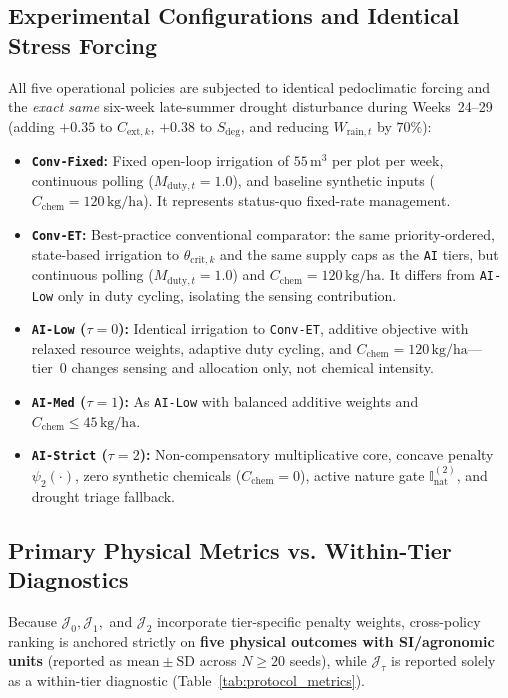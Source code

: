 \documentclass[11pt,a4paper]{article}
\newcommand{\Inat}{\mathbb{I}_{\mathrm{nat}}}
\begin{document}
\subsection{Experimental Configurations and Identical Stress Forcing}
All five operational policies are subjected to identical pedoclimatic forcing and the \emph{exact same} six-week late-summer drought disturbance during Weeks~24--29 (adding $+0.35$ to $C_{\mathrm{ext},k}$, $+0.38$ to $S_{\mathrm{deg}}$, and reducing $W_{\mathrm{rain},t}$ by $70\%$):
\begin{itemize}
  \item \textbf{\texttt{Conv-Fixed}:} Fixed open-loop irrigation of $55\,\mathrm{m}^3$ per plot per week, continuous polling ($M_{\mathrm{duty},t}=1.0$), and baseline synthetic inputs ($C_{\mathrm{chem}}=120\,\mathrm{kg/ha}$). It represents status-quo fixed-rate management.
  \item \textbf{\texttt{Conv-ET}:} Best-practice conventional comparator: the same priority-ordered, state-based irrigation to $\theta_{\mathrm{crit},k}$ and the same supply caps as the \texttt{AI} tiers, but continuous polling ($M_{\mathrm{duty},t}=1.0$) and $C_{\mathrm{chem}}=120\,\mathrm{kg/ha}$. It differs from \texttt{AI-Low} only in duty cycling, isolating the sensing contribution.
  \item \textbf{\texttt{AI-Low} ($\tau=0$):} Identical irrigation to \texttt{Conv-ET}, additive objective with relaxed resource weights, adaptive duty cycling, and $C_{\mathrm{chem}}=120\,\mathrm{kg/ha}$---tier~0 changes sensing and allocation only, not chemical intensity.
  \item \textbf{\texttt{AI-Med} ($\tau=1$):} As \texttt{AI-Low} with balanced additive weights and $C_{\mathrm{chem}} \le 45\,\mathrm{kg/ha}$.
  \item \textbf{\texttt{AI-Strict} ($\tau=2$):} Non-compensatory multiplicative core, concave penalty $\psi_2(\cdot)$, zero synthetic chemicals ($C_{\mathrm{chem}}=0$), active nature gate $\Inat^{(2)}$, and drought triage fallback.
\end{itemize}

\subsection{Primary Physical Metrics vs. Within-Tier Diagnostics}
Because $\mathcal{J}_0, \mathcal{J}_1,$ and $\mathcal{J}_2$ incorporate tier-specific penalty weights, cross-policy ranking is anchored strictly on \textbf{five physical outcomes with SI/agronomic units} (reported as $\mathrm{mean} \pm \mathrm{SD}$ across $N \ge 20$ seeds), while $\mathcal{J}_\tau$ is reported solely as a within-tier diagnostic (Table~\ref{tab:protocol_metrics}).
\end{document}

